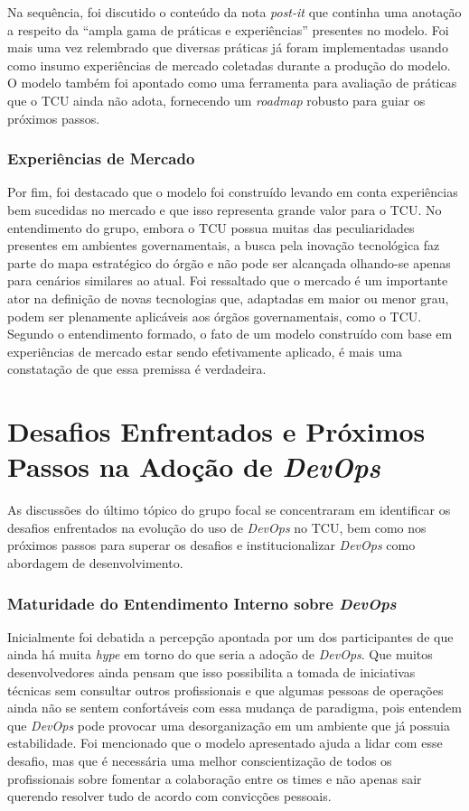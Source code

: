 Na sequência, foi discutido o conteúdo da nota {\it post-it} que continha uma
anotação a respeito da ``ampla gama de práticas e experiências'' presentes no
modelo. Foi mais uma vez relembrado que diversas práticas já foram implementadas usando como insumo experiências
de mercado coletadas durante a produção do modelo. O modelo também foi apontado
como uma ferramenta para avaliação de práticas que o \acrshort{TCU} ainda não
adota, fornecendo um {\it roadmap} robusto para guiar os próximos passos.

\subsubsection{Experiências de Mercado}

Por fim, foi destacado que o modelo foi construído levando em conta
experiências bem sucedidas no mercado e que isso representa grande valor para
o \acrshort{TCU}. No entendimento do grupo, embora o \acrshort{TCU} possua
muitas das peculiaridades presentes em ambientes governamentais, a busca pela
inovação tecnológica faz parte do mapa estratégico do órgão e não pode ser
alcançada olhando-se apenas para cenários similares ao atual. Foi ressaltado
que o mercado é um importante ator na definição de novas tecnologias que,
adaptadas em maior ou menor grau, podem ser plenamente aplicáveis aos órgãos
governamentais, como o TCU. Segundo o entendimento formado, o fato de um modelo
construído com base em experiências de mercado estar sendo efetivamente
aplicado, é mais uma constatação de que essa premissa é verdadeira.

\section{Desafios Enfrentados e Próximos Passos na Adoção de \emph{DevOps}}\label{secao_resultados_grupo_2}

As discussões do último tópico do grupo focal se concentraram em identificar
os desafios enfrentados na evolução do uso de {\it DevOps} no \acrshort{TCU},
bem como nos próximos passos para superar os desafios e institucionalizar
{\it DevOps} como abordagem de desenvolvimento.

\subsubsection{Maturidade do Entendimento Interno sobre \emph{DevOps}}
Inicialmente foi debatida a percepção apontada por um dos participantes de que
ainda há muita {\it hype} em torno do que seria a adoção de {\it DevOps}. Que
muitos desenvolvedores ainda pensam que isso possibilita a tomada de
iniciativas técnicas sem consultar outros profissionais e que algumas pessoas de
operações ainda não se sentem confortáveis com essa mudança de paradigma, pois
entendem que {\it DevOps} pode provocar uma desorganização em um ambiente que já
possuia estabilidade. Foi mencionado que o modelo apresentado
ajuda a lidar com esse desafio, mas que é necessária uma melhor conscientização
de todos os profissionais sobre fomentar a colaboração entre os times e não
apenas sair querendo resolver tudo de acordo com convicções pessoais.

